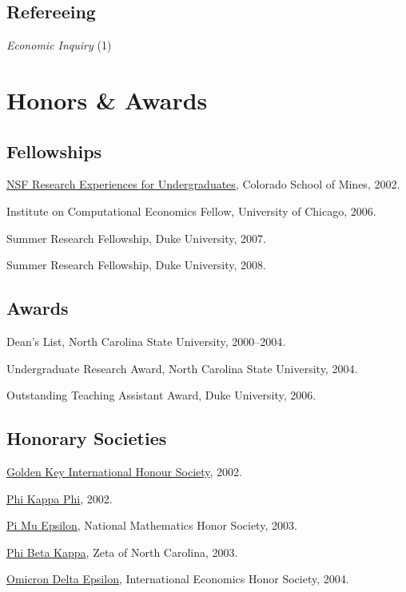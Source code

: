 \documentclass[letterpaper]{article}
\renewenvironment{itemize}{
  \begin{list}{}{
    \setlength{\leftmargin}{1em}
  }
}{
  \end{list}
}
\begin{document}
\subsection*{Refereeing}

\begin{itemize}
\item \textit{Economic Inquiry} (1)
\end{itemize}


\section*{Honors \& Awards}

\subsection*{Fellowships}

\begin{itemize}
\item \href{http://www.nsf.gov/crssprgm/reu/}{NSF Research Experiences
    for Undergraduates}, Colorado School of Mines, 2002.
\item Institute on Computational Economics Fellow, University of Chicago, 2006.
\item Summer Research Fellowship, Duke University, 2007.
\item Summer Research Fellowship, Duke University, 2008.
\end{itemize}

\subsection*{Awards}

\begin{itemize}
\item Dean's List, North Carolina State University, 2000--2004.
\item Undergraduate Research Award, North Carolina State University, 2004.
\item Outstanding Teaching Assistant Award, Duke University, 2006.
\end{itemize}

\subsection*{Honorary Societies}

\begin{itemize}
\item \href{http://www.goldenkey.org}{Golden Key International
    Honour Society}, 2002.
\item \href{http://www.phikappaphi.org/}{Phi Kappa Phi}, 2002.
\item \href{http://www.pme-math.org/}{Pi Mu Epsilon},
  National Mathematics Honor Society,
  2003.
\item \href{http://www.pbk.org/}{Phi Beta Kappa}, Zeta of North Carolina, 2003.
\item \href{http://www.cba.ua.edu/~ode/}{Omicron Delta Epsilon},
  International Economics Honor Society,
  2004.
\end{itemize}
\end{document}
